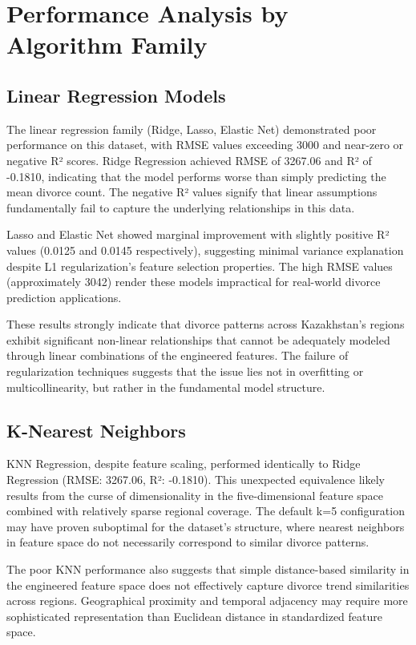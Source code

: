 \section{Performance Analysis by Algorithm Family}

\subsection{Linear Regression Models}

The linear regression family (Ridge, Lasso, Elastic Net) demonstrated poor performance on this dataset, with RMSE values exceeding 3000 and near-zero or negative R² scores. Ridge Regression achieved RMSE of 3267.06 and R² of -0.1810, indicating that the model performs worse than simply predicting the mean divorce count. The negative R² values signify that linear assumptions fundamentally fail to capture the underlying relationships in this data.

Lasso and Elastic Net showed marginal improvement with slightly positive R² values (0.0125 and 0.0145 respectively), suggesting minimal variance explanation despite L1 regularization's feature selection properties. The high RMSE values (approximately 3042) render these models impractical for real-world divorce prediction applications.

These results strongly indicate that divorce patterns across Kazakhstan's regions exhibit significant non-linear relationships that cannot be adequately modeled through linear combinations of the engineered features. The failure of regularization techniques suggests that the issue lies not in overfitting or multicollinearity, but rather in the fundamental model structure.

\subsection{K-Nearest Neighbors}

KNN Regression, despite feature scaling, performed identically to Ridge Regression (RMSE: 3267.06, R²: -0.1810). This unexpected equivalence likely results from the curse of dimensionality in the five-dimensional feature space combined with relatively sparse regional coverage. The default k=5 configuration may have proven suboptimal for the dataset's structure, where nearest neighbors in feature space do not necessarily correspond to similar divorce patterns.

The poor KNN performance also suggests that simple distance-based similarity in the engineered feature space does not effectively capture divorce trend similarities across regions. Geographical proximity and temporal adjacency may require more sophisticated representation than Euclidean distance in standardized feature space.

